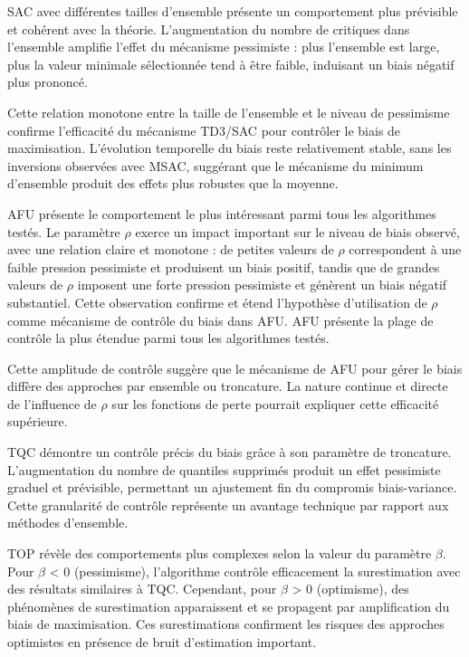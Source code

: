 \documentclass[a4paper, 12pt]{report}
\begin{document}
    SAC avec différentes tailles d'ensemble présente un comportement plus
    prévisible et cohérent avec la théorie. L'augmentation du nombre de
    critiques dans l'ensemble amplifie l'effet du mécanisme pessimiste : plus
    l'ensemble est large, plus la valeur minimale sélectionnée tend à être
    faible, induisant un biais négatif plus prononcé.

    Cette relation monotone entre la taille de l'ensemble et le niveau de
    pessimisme confirme l'efficacité du mécanisme TD3/SAC pour contrôler le
    biais de maximisation. L'évolution temporelle du biais reste relativement
    stable, sans les inversions observées avec MSAC, suggérant que le mécanisme
    du minimum d'ensemble produit des effets plus robustes que la moyenne.

    AFU présente le comportement le plus intéressant parmi tous les algorithmes
    testés. Le paramètre $\rho$ exerce un impact important sur le niveau de
    biais observé, avec une relation claire et monotone : de petites valeurs de
    $\rho$ correspondent à une faible pression pessimiste et produisent un
    biais positif, tandis que de grandes valeurs de $\rho$ imposent une forte
    pression pessimiste et génèrent un biais négatif substantiel. Cette
    observation confirme et étend l'hypothèse d'utilisation de $\rho$ comme
    mécanisme de contrôle du biais dans AFU. AFU présente la plage de contrôle
    la plus étendue parmi tous les algorithmes testés.

    Cette amplitude de contrôle suggère que le mécanisme de AFU pour gérer le
    biais diffère des approches par ensemble ou troncature. La nature continue
    et directe de l'influence de $\rho$ sur les fonctions de perte pourrait
    expliquer cette efficacité supérieure.

    TQC démontre un contrôle précis du biais grâce à son paramètre de
    troncature. L'augmentation du nombre de quantiles supprimés produit un
    effet pessimiste graduel et prévisible, permettant un ajustement fin du
    compromis biais-variance. Cette granularité de contrôle représente un
    avantage technique par rapport aux méthodes d'ensemble.

    TOP révèle des comportements plus complexes selon la valeur du paramètre
    $\beta$. Pour $\beta$ < 0 (pessimisme), l'algorithme contrôle efficacement
    la surestimation avec des résultats similaires à TQC. Cependant, pour
    $\beta$ > 0 (optimisme), des phénomènes de surestimation apparaissent et se
    propagent par amplification du biais de maximisation. Ces surestimations
    confirment les risques des approches optimistes en présence de bruit
    d'estimation important.
\end{document}
